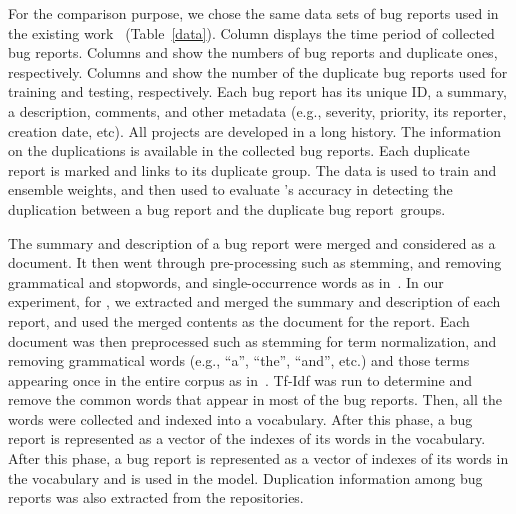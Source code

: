 For the comparison purpose, we chose the same data sets of bug reports
used in the existing work~\cite{davidlo10} (Table~\ref{data}).
Column  displays the time period of collected bug
reports. Columns  and  show the numbers of bug
reports and duplicate ones, respectively. Columns  and
 show the number of the duplicate bug reports used for
training and testing, respectively. Each bug report has its unique
ID, a summary, a description, comments, and other metadata
(e.g., severity, priority, its reporter, creation date, etc). All
projects are developed in a long history.  
%
The information on the duplications is available in the 
collected bug reports. 
Each duplicate report is marked and links to its duplicate group. The
data is used to train {\model} and ensemble weights, and then used to
evaluate {\model}'s accuracy in detecting the duplication between a
bug report and the duplicate bug report~groups.



The summary and description of a bug report were merged and considered
as a document. It then went through pre-processing such as stemming,
and removing grammatical and stopwords, and single-occurrence words
as in~\cite{davidlo10}.
In our experiment, for {\model}, we extracted and merged the summary
and description of each report, and used the merged contents as the
document for the report. Each document was then preprocessed such as
stemming for term normalization, and removing grammatical words
(e.g., ``a'', ``the'', ``and'', etc.) and those terms appearing once in
the entire corpus as in~\cite{RTM}. Tf-Idf was run to determine and
remove the common words that appear in most of the bug reports.
Then, all the words were collected and indexed into a vocabulary.
After this phase, a bug report is represented as a vector of the
indexes of its words in the vocabulary. After this phase, a bug report is
represented as a vector of indexes of its words in the vocabulary and
is used in the model. Duplication information among bug reports was
also extracted from the repositories.

